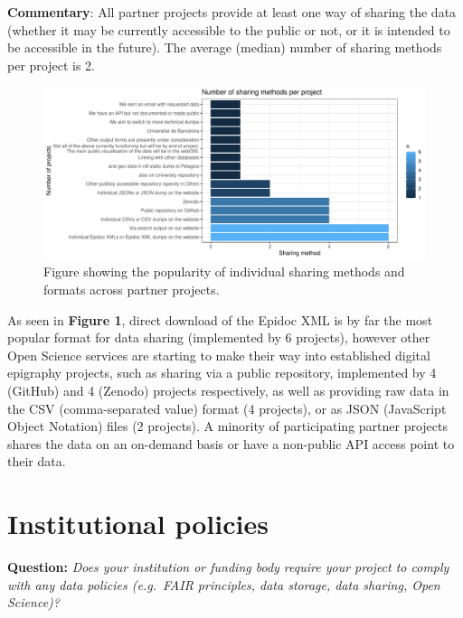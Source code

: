 \documentclass[
  12pt,
]{scrreprt}
\begin{document}
\normalsize

\textbf{Commentary}: All partner projects provide at least one way of
sharing the data (whether it may be currently accessible to the public
or not, or it is intended to be accessible in the future). The average
(median) number of sharing methods per project is 2.

\footnotesize

\begin{figure}

{\centering \includegraphics{01_FAIR_epi_report_files/figure-latex/fig1-1} 

}

\caption{Figure showing the popularity of individual sharing methods and formats across partner projects.}\label{fig:fig1}
\end{figure}

\normalsize

As seen in \textbf{Figure 1}, direct download of the Epidoc XML is by
far the most popular format for data sharing (implemented by 6
projects), however other Open Science services are starting to make
their way into established digital epigraphy projects, such as sharing
via a public repository, implemented by 4 (GitHub) and 4 (Zenodo)
projects respectively, as well as providing raw data in the CSV
(comma-separated value) format (4 projects), or as JSON (JavaScript
Object Notation) files (2 projects). A minority of participating partner
projects shares the data on an on-demand basis or have a non-public API
access point to their data.

\hypertarget{institutional-policies}{%
\section{Institutional policies}\label{institutional-policies}}

\textbf{Question:} \emph{Does your institution or funding body require
your project to comply with any data policies (e.g.~FAIR principles,
data storage, data sharing, Open Science)?}
\end{document}
